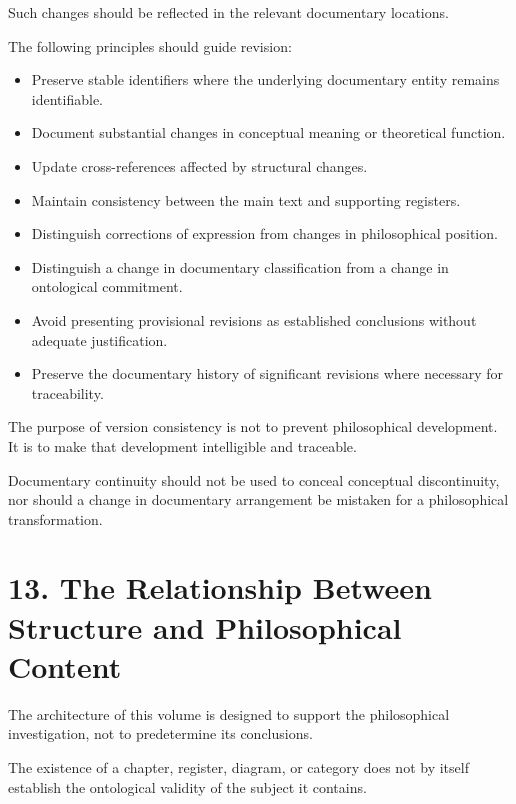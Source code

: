 Such changes should be reflected in the
relevant documentary locations.

The following principles should guide revision:

\begin{itemize}
    \item Preserve stable identifiers where
    the underlying documentary entity remains
    identifiable.
    \item Document substantial changes in
    conceptual meaning or theoretical function.
    \item Update cross-references affected
    by structural changes.
    \item Maintain consistency between the
    main text and supporting registers.
    \item Distinguish corrections of expression
    from changes in philosophical position.
    \item Distinguish a change in documentary
    classification from a change in ontological
    commitment.
    \item Avoid presenting provisional revisions
    as established conclusions without adequate
    justification.
    \item Preserve the documentary history of
    significant revisions where necessary
    for traceability.
\end{itemize}

The purpose of version consistency is not
to prevent philosophical development.
It is to make that development intelligible
and traceable.

Documentary continuity should not be used
to conceal conceptual discontinuity, nor
should a change in documentary arrangement
be mistaken for a philosophical transformation.


\section*{13. The Relationship Between Structure and Philosophical Content}

The architecture of this volume is designed
to support the philosophical investigation,
not to predetermine its conclusions.

The existence of a chapter, register, diagram,
or category does not by itself establish
the ontological validity of the subject
it contains.

